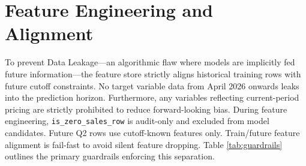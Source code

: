 \section{Feature Engineering and Alignment}
To prevent Data Leakage---an algorithmic flaw where models are implicitly fed future information---the feature store strictly aligns historical training rows with future cutoff constraints. No target variable data from April 2026 onwards leaks into the prediction horizon. Furthermore, any variables reflecting current-period pricing are strictly prohibited to reduce forward-looking bias.
During feature engineering, \texttt{is\_zero\_sales\_row} is audit-only and excluded from model candidates. Future Q2 rows use cutoff-known features only. Train/future feature alignment is fail-fast to avoid silent feature dropping.
Table \ref{tab:guardrails} outlines the primary guardrails enforcing this separation.


\FloatBarrier
